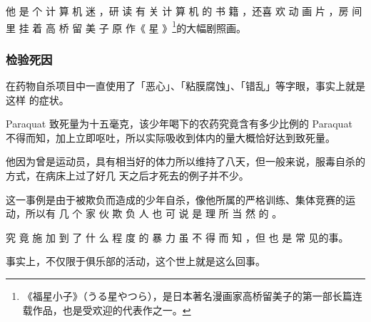 \documentclass[UTF8]{ctexart}
\begin{document}
他 是 个 计 算 机 迷 ，研 读 有 关 计 算 机 的 书 籍 ，还喜 欢 动 画 片 ，房 间 里 挂 着 高 桥 留 美 子 原 作《 星 》\footnote{《福星小子》（うる星やつら），是日本著名漫画家高桥留美子的第一部长篇连载作品，也是受欢迎的代表作之一。}的大幅剧照画。

\subsubsection*{检验死因}

在药物自杀项目中一直使用了「恶心」、「粘膜腐蚀」、「错乱」等字眼，事实上就是这样
的症状。

Paraquat 致死量为十五毫克，该少年喝下的农药究竟含有多少比例的 Paraquat
不得而知，加上立即呕吐，所以实际吸收到体内的量大概恰好达到致死量。

他因为曾是运动员，具有相当好的体力所以维持了八天，但一般来说，服毒自杀的方式，在病床上过了好几
天之后才死去的例子并不少。

这一事例是由于被欺负而造成的少年自杀，像他所属的严格训练、集体竞赛的运动，所以有 几 个 家 伙 欺 负 人 也 可 说 是 理 所 当 然 的 。

究 竟 施 加 到 了 什 么 程 度 的 暴 力 虽 不 得 而 知 ，但 也 是 常 见的事。

事实上，不仅限于俱乐部的活动，这个世上就是这么回事。
\end{document}
